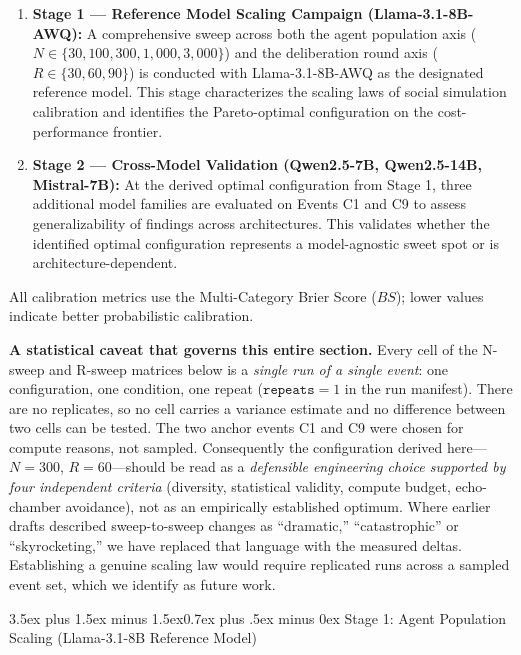 \documentclass[11pt,journal,onecolumn]{IEEEtran}
\makeatletter
\renewcommand\subsection{\@startsection{subsection}{2}{\z@}%
  {3.5ex plus 1.5ex minus 1.5ex}{0.7ex plus .5ex minus 0ex}%
  {\normalfont\normalsize\bfseries}}
\makeatother
\begin{document}
\begin{enumerate}
    \item \textbf{Stage 1 --- Reference Model Scaling Campaign (Llama-3.1-8B-AWQ):} A comprehensive sweep across both the agent population axis ($N \in \{30, 100, 300, 1{,}000, 3{,}000\}$) and the deliberation round axis ($R \in \{30, 60, 90\}$) is conducted with Llama-3.1-8B-AWQ as the designated reference model. This stage characterizes the scaling laws of social simulation calibration and identifies the Pareto-optimal configuration on the cost-performance frontier.
    \item \textbf{Stage 2 --- Cross-Model Validation (Qwen2.5-7B, Qwen2.5-14B, Mistral-7B):} At the derived optimal configuration from Stage 1, three additional model families are evaluated on Events C1 and C9 to assess generalizability of findings across architectures. This validates whether the identified optimal configuration represents a model-agnostic sweet spot or is architecture-dependent.
\end{enumerate}

All calibration metrics use the Multi-Category Brier Score ($BS$); lower values indicate better probabilistic calibration.

\textbf{A statistical caveat that governs this entire section.} Every cell of the N-sweep and R-sweep matrices below is a \emph{single run of a single event}: one configuration, one condition, one repeat ($\texttt{repeats}=1$ in the run manifest). There are no replicates, so no cell carries a variance estimate and no difference between two cells can be tested. The two anchor events C1 and C9 were chosen for compute reasons, not sampled. Consequently the configuration derived here---$N=300$, $R=60$---should be read as a \emph{defensible engineering choice supported by four independent criteria} (diversity, statistical validity, compute budget, echo-chamber avoidance), not as an empirically established optimum. Where earlier drafts described sweep-to-sweep changes as ``dramatic,'' ``catastrophic'' or ``skyrocketing,'' we have replaced that language with the measured deltas. Establishing a genuine scaling law would require replicated runs across a sampled event set, which we identify as future work.

\subsection{Stage 1: Agent Population Scaling (Llama-3.1-8B Reference Model)}
\label{sec:n_scaling}
\end{document}
